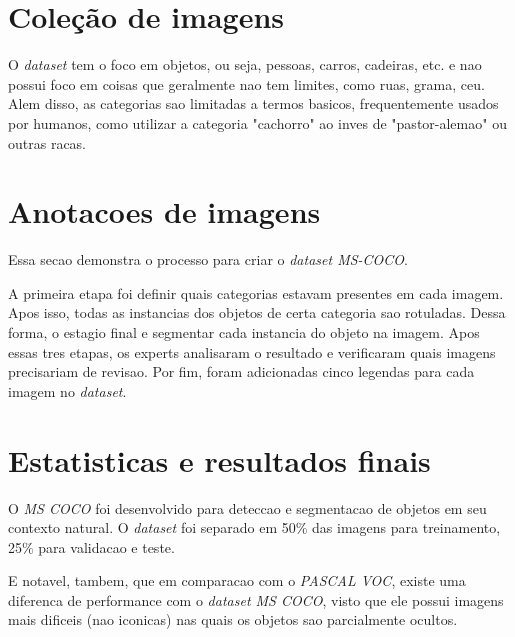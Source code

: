\documentclass[12pt]{article}
\begin{document}
\section*{Coleção de imagens}

O \textit{dataset} tem o foco em objetos, ou seja, pessoas, carros, cadeiras, etc. e nao possui foco em coisas que geralmente nao tem limites, como ruas, grama, ceu. Alem disso, as categorias sao limitadas a termos basicos, frequentemente usados por humanos, como utilizar a categoria "cachorro" ao inves de "pastor-alemao" ou outras racas.

\section*{Anotacoes de imagens}

Essa secao demonstra o processo para criar o \textit{dataset MS-COCO}.

A primeira etapa foi definir quais categorias estavam presentes em cada imagem. Apos isso, todas as instancias dos objetos de certa categoria sao rotuladas. Dessa forma, o estagio final e segmentar cada instancia do objeto na imagem. Apos essas tres etapas, os experts analisaram o resultado e verificaram quais imagens precisariam de revisao. Por fim, foram adicionadas cinco legendas para cada imagem no \textit{dataset}.

\section*{Estatisticas e resultados finais}

O \textit{MS COCO} foi desenvolvido para deteccao e segmentacao de objetos em seu contexto natural. O \textit{dataset} foi separado em 50$\%$ das imagens para treinamento, 25$\%$ para validacao e teste.

E notavel, tambem, que em comparacao com o \textit{PASCAL VOC}, existe uma diferenca de performance com o \textit{dataset MS COCO}, visto que ele possui imagens mais dificeis (nao iconicas) nas quais os objetos sao parcialmente ocultos.
\end{document}
